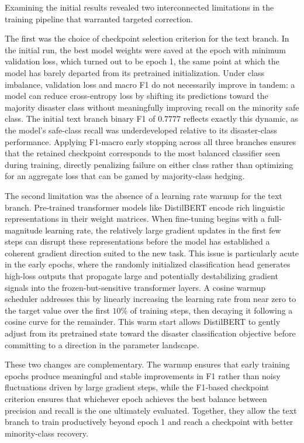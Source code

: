 \documentclass[11pt,letterpaper]{article}
\begin{document}
Examining the initial results revealed two interconnected limitations in the training pipeline that warranted targeted correction.

The first was the choice of checkpoint selection criterion for the text branch. In the initial run, the best model weights were saved at the epoch with minimum validation loss, which turned out to be epoch 1, the same point at which the model has barely departed from its pretrained initialization. Under class imbalance, validation loss and macro F1 do not necessarily improve in tandem: a model can reduce cross-entropy loss by shifting its predictions toward the majority disaster class without meaningfully improving recall on the minority safe class. The initial text branch binary F1 of $0.7777$ reflects exactly this dynamic, as the model's safe-class recall was underdeveloped relative to its disaster-class performance. Applying F1-macro early stopping across all three branches ensures that the retained checkpoint corresponds to the most balanced classifier seen during training, directly penalizing failure on either class rather than optimizing for an aggregate loss that can be gamed by majority-class hedging.

The second limitation was the absence of a learning rate warmup for the text branch. Pre-trained transformer models like DistilBERT encode rich linguistic representations in their weight matrices. When fine-tuning begins with a full-magnitude learning rate, the relatively large gradient updates in the first few steps can disrupt these representations before the model has established a coherent gradient direction suited to the new task. This issue is particularly acute in the early epochs, where the randomly initialized classification head generates high-loss outputs that propagate large and potentially destabilizing gradient signals into the frozen-but-sensitive transformer layers. A cosine warmup scheduler addresses this by linearly increasing the learning rate from near zero to the target value over the first $10\%$ of training steps, then decaying it following a cosine curve for the remainder. This warm start allows DistilBERT to gently adjust from its pretrained state toward the disaster classification objective before committing to a direction in the parameter landscape.

These two changes are complementary. The warmup ensures that early training epochs produce meaningful and stable improvements in F1 rather than noisy fluctuations driven by large gradient steps, while the F1-based checkpoint criterion ensures that whichever epoch achieves the best balance between precision and recall is the one ultimately evaluated. Together, they allow the text branch to train productively beyond epoch 1 and reach a checkpoint with better minority-class recovery.
\end{document}
